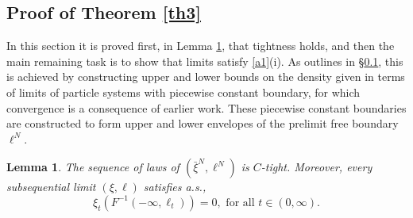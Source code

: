 \documentclass[11pt]{amsart}
\theoremstyle{plain}
\newtheorem{lemma}[theorem]{Lemma}
\newcommand{\iy}{\infty}
\begin{document}
\subsection{Proof of Theorem \ref{th3}}\label{sec32}

In this section it is proved first, in Lemma \ref{lem53}, that tightness holds,
and then the main remaining task is to show that limits satisfy \eqref{a1}(i). As outlines in \S\ref{sec32}, this is achieved by constructing upper and lower bounds on the density
given in terms of limits of particle systems with piecewise constant boundary,
for which convergence is a consequence of earlier work. These piecewise constant
boundaries are constructed to form upper and lower envelopes of the prelimit
free boundary $\ell^N$.

\begin{lemma}\label{lem53}
The sequence of laws of $(\bar\xi^N,\ell^N)$ is $C$-tight.
Moreover, every subsequential limit $(\xi,\ell)$ satisfies a.s.,
\[
\xi_t(F^{-1}(-\iy,\ell_t))=0, \text{ for all } t\in(0,\iy).
\]
\end{lemma}
\end{document}
